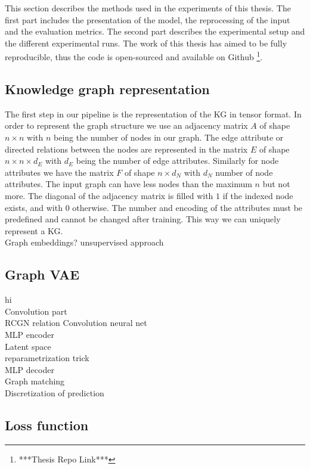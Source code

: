 This section describes the methods used in the experiments of this thesis. The first part includes the presentation of the model, the reprocessing of the input and the evaluation metrics. The second part describes the experimental setup and the different experimental runs. The work of this thesis has aimed to be fully reproducible, thus the code is open-sourced and available on Github \footnote{***Thesis Repo Link***}.

\subsection{Knowledge graph representation}

The first step in our pipeline is the representation of the KG in tensor format. In order to represent the graph structure we use an adjacency matrix $A$ of shape $n\times n$ with $n$ being the number of nodes in our graph. The edge attribute or directed relations between the nodes are represented in the matrix $E$ of shape $n\times n\times d_E$ with $d_E$ being the number of edge attributes. Similarly for node attributes we have the matrix $F$ of shape $n\times d_N$ with $d_N$ number of node attributes. The input graph can have less nodes than the maximum $n$ but not more. The diagonal of the adjacency matrix is filled with $1$ if the indexed node exists, and with $0$ otherwise. The number and encoding of the attributes must be predefined and cannot be changed after training. This way we can uniquely represent a KG.
\\


Graph embeddings? unsupervised approach

\subsection{Graph VAE}
hi
\\Convolution part
\\RCGN relation Convolution neural net
\\MLP encoder
\\Latent space
\\reparametrization trick
\\MLP decoder
\\Graph matching
\\Discretization of prediction

\subsection{Loss function}

